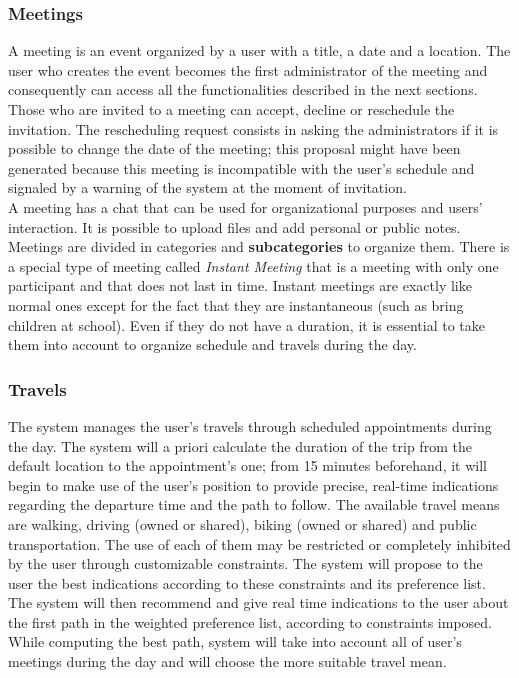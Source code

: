 
\subsubsection{Meetings}
A meeting is an event organized by a user with a title, a date and a location. The user who creates the event becomes the first administrator of the meeting and consequently can access all the functionalities described in the next sections. Those who are invited to a meeting can accept, decline or reschedule the invitation. The rescheduling request consists in asking the administrators if it is possible to change the date of the meeting; this proposal might have been generated because this meeting is incompatible with the user's schedule and signaled by a warning of the system at the moment of invitation. \\
A meeting has a chat that can be used for organizational purposes and users' interaction. It is possible to upload files and add personal or public notes.\\
Meetings are divided in categories and \textbf{subcategories} to organize them. There is a special type of meeting called \textit{Instant Meeting} that is a meeting with only one participant and that does not last in time. Instant meetings are exactly like normal ones except for the fact that they are instantaneous (such as bring children at school). Even if they do not have a duration, it is essential to take them into account to organize schedule and travels during the day.
	
\subsubsection{Travels}

The system manages the user's travels through scheduled appointments during the day. The system will a priori calculate the duration of the trip from the default location to the appointment's one; from 15 minutes beforehand, it will begin to make use of the user's position to provide precise, real-time indications regarding the departure time and the path to follow. The available travel means are walking, driving (owned or shared), biking (owned or shared) and public transportation. The use of each of them may be restricted or completely inhibited by the user through customizable constraints. The system will propose to the user the best indications according to these constraints and its preference list. The system will then recommend and give real time indications to the user about the first path in the weighted preference list, according to constraints imposed. While computing the best path, system will take into account all of user's meetings during the day and will choose the more suitable travel mean.
